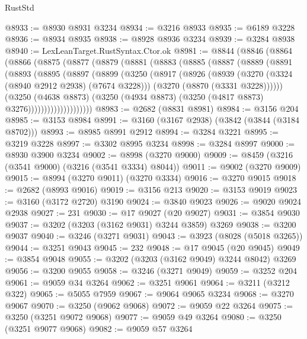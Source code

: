\begin{lexlean}{RustStd}
\begin{coremodule}
@8933 := @8930 @8931 @3234
@8934 := @3216 @8933
@8935 := @6189 @3228
@8936 := @8934 @8935
@8938 := @8928 @8936 @3234
@8939 := @3284 @8938
@8940 := LexLeanTarget.RustSyntax.Ctor.ok
@8981 := @8844
    (@8846
      (@8864
        (@8866
          (@8875
            (@8877
              (@8879
                (@8881
                  (@8883
                    (@8885
                      (@8887
                        (@8889
                          (@8891
                            (@8893
                              (@8895
                                (@8897
                                  (@8899
                                    (@3250
                                      (@8917
                                        (@8926
                                          (@8939
                                            (@3270 (@3324 (@8940 @2912 @2938) (@7674 @3228)))
                                            (@3270 (@8870 (@3331 @3228))))))
                                      (@3250
                                        (@4638 @8873)
                                        (@3250
                                          (@4934 @8873)
                                          (@3250 (@4817 @8873) @3276))))))))))))))))))))
@8983 := @2682 (@8831 @8981)
@8984 := @3156 @204
@8985 := @3153 @8984
@8991 := @3160 (@3167 @2938) (@3842 (@3844 (@3184 @8702)))
@8993 := @8985 @8991 @2912
@8994 := @3284 @3221
@8995 := @3219 @3228
@8997 := @3302 @8995 @3234
@8998 := @3284 @8997
@9000 := @8930 @3900 @3234
@9002 := @8998 (@3270 @9000)
@9009 := @8459 (@3216 (@3541 @9000) (@3216 (@3541 @3334) @8044))
@9011 := @9002 (@3270 @9009)
@9015 := @8994 (@3270 @9011) (@3270 @3334)
@9016 := @3270 @9015
@9018 := @2682 (@8993 @9016)
@9019 := @3156 @213
@9020 := @3153 @9019
@9023 := @3160 (@3172 @2720) @3190
@9024 := @3840 @9023
@9026 := @9020 @9024 @2938
@9027 := 231
@9030 := @17 @9027 (@20 @9027)
@9031 := @3854 @9030
@9037 := @3202 (@3203 (@3162 @9031) @3244 @3859) @3269
@9038 := @3200 @9037
@9040 := @3246 (@3271 @9031)
@9043 := @3923 (@8028 (@5018 @3265))
@9044 := @3251 @9043
@9045 := 232
@9048 := @17 @9045 (@20 @9045)
@9049 := @3854 @9048
@9055 := @3202 (@3203 (@3162 @9049) @3244 @8042) @3269
@9056 := @3200 @9055
@9058 := @3246 (@3271 @9049)
@9059 := @3252 @204
@9061 := @9059 @34 @3264
@9062 := @3251 @9061
@9064 := @3211 (@3212 @322)
@9065 := @5055 @7959
@9067 := @9064 @9065 @3234
@9068 := @3270 @9067
@9070 := @3250 (@9062 @9068)
@9072 := @9059 @22 @3264
@9075 := @3250 (@3251 @9072 @9068)
@9077 := @9059 @49 @3264
@9080 := @3250 (@3251 @9077 @9068)
@9082 := @9059 @57 @3264

\end{coremodule}
\end{lexlean}
